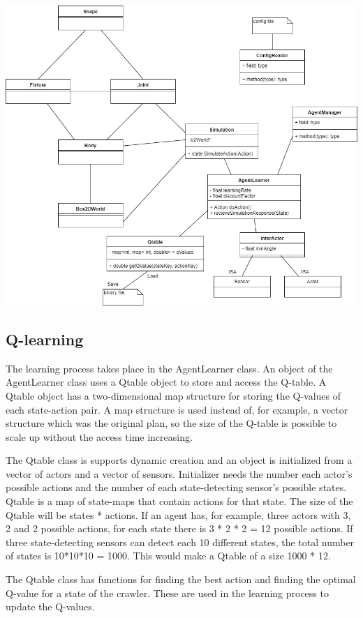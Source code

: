 \documentclass{article}
\begin{document}
\includegraphics[width=1\textwidth]{c++UML}

\subsection{Q-learning}
The learning process takes place in the AgentLearner class.
An object of the AgentLearner
class uses a Qtable object to store and access the Q-table. A Qtable object
has a two-dimensional map structure for storing the Q-values of each
state-action pair. A map structure is used instead of, for example,
a vector structure which was the original plan, so the size of
the Q-table is possible to scale up without the access time increasing.

The Qtable class is supports dynamic creation and an object is initialized
from a vector of actors and a vector of sensors. Initializer needs
the number each actor's possible actions and the number of each
state-detecting sensor's possible states. Qtable is a map of
state-maps that contain actions for that state. The size of the Qtable
will be states * actions. If an agent has, for example, three actors
with 3, 2 and 2 possible actions, for each state there is
3 * 2 * 2 = 12 possible actions. If three state-detecting sensors can
detect each 10 different states, the total number of states is
10*10*10 = 1000. This would make a Qtable of a size 1000 * 12.

The Qtable class has functions for finding the best action and finding
the optimal Q-value for a state of the crawler. These are used in the
learning process to update the Q-values.
\end{document}

